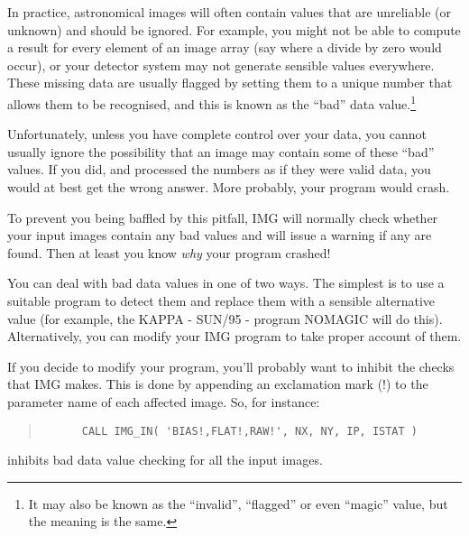 \documentclass[twoside,11pt]{article}
\newcommand{\xref}[3]{#1}
\renewcommand{\_}{\texttt{\symbol{95}}}
\newenvironment{code}{\begin{small} \begin{quote}}
                     {\end{quote} \end{small}}
\begin{document}
In practice, astronomical images will often contain values that are
unreliable (or unknown) and should be ignored. For example, you might
not be able to compute a result for every element of an image array
(say where a divide by zero would occur), or your detector system may
not generate sensible values everywhere.  These missing data are
usually flagged by setting them to a unique number that allows them to
be recognised, and this is known as the ``bad'' data
value.\footnote{It may also be known as the ``invalid'', ``flagged''
or even ``magic'' value, but the meaning is the same.}

Unfortunately, unless you have complete control over your data, you
cannot usually ignore the possibility that an image may contain some
of these ``bad'' values.  If you did, and processed the numbers as if
they were valid data, you would at best get the wrong answer. More
probably, your program would crash.

To prevent you being baffled by this pitfall, IMG will normally check
whether your input images contain any bad values and will issue a
warning if any are found. Then at least you know {\em why} your
program crashed!

You can deal with bad data values in one of two ways. The simplest is
to use a suitable program to detect them and replace them with a
sensible alternative value (for example, the KAPPA -
\xref{SUN/95}{sun95}{} - program \xref{NOMAGIC}{sun95}{NOMAGIC} will
do this). Alternatively, you can modify your IMG program to take
proper account of them.

If you decide to modify your program, you'll probably want to inhibit
the checks that IMG makes. This is done by appending an exclamation
mark (!) to the parameter name of each affected image. So, for
instance:
\begin{code}
\begin{verbatim}
      CALL IMG_IN( 'BIAS!,FLAT!,RAW!', NX, NY, IP, ISTAT )
\end{verbatim}
\end{code}
inhibits bad data value checking for all the input images.
\end{document}
